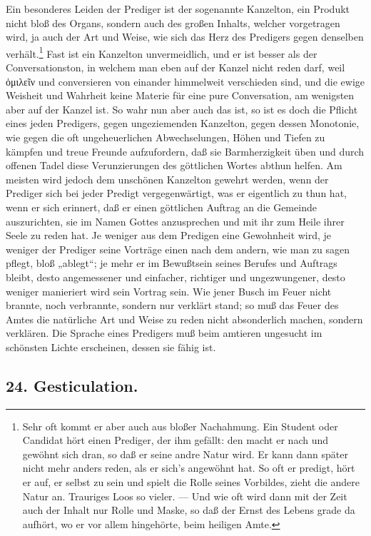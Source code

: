 Ein besonderes Leiden der Prediger ist der sogenannte Kanzelton, ein Produkt nicht bloß des Organs, sondern auch des großen Inhalts, welcher vorgetragen wird, ja auch der Art und Weise, wie sich das Herz des Predigers gegen denselben verhält.\footnote{Sehr oft kommt er aber auch aus bloßer Nachahmung. Ein Student oder Candidat hört einen Prediger, der ihm gefällt: den macht er nach und gewöhnt sich dran, so daß er seine andre Natur wird. Er kann dann später nicht mehr anders reden, als er sich’s angewöhnt hat. So oft er predigt, hört er auf, er selbst zu sein und spielt die Rolle seines Vorbildes, zieht die andere Natur an. Trauriges Loos so vieler. — Und wie oft wird dann mit der Zeit auch der Inhalt nur Rolle und Maske, so daß der Ernst des Lebens grade da aufhört, wo er vor allem hingehörte, beim heiligen Amte.} Fast ist ein Kanzelton unvermeidlich, und
er ist besser als der Conversationston, in welchem man eben auf der Kanzel nicht reden darf, weil ὁμιλεῖν und conversieren von einander himmelweit verschieden sind, und die ewige Weisheit und Wahrheit keine Materie für eine pure Conversation, am wenigsten aber auf der Kanzel ist. So wahr nun aber auch das ist, so ist es doch die Pflicht eines jeden Predigers, gegen ungeziemenden Kanzelton, gegen dessen Monotonie, wie gegen die oft ungeheuerlichen Abwechselungen, Höhen und Tiefen zu kämpfen und treue Freunde aufzufordern, daß sie Barmherzigkeit üben und durch offenen Tadel diese Verunzierungen des göttlichen Wortes abthun helfen. Am meisten wird jedoch dem unschönen Kanzelton gewehrt werden, wenn der Prediger sich bei jeder Predigt vergegenwärtigt, was er eigentlich zu thun hat, wenn er sich erinnert, daß er einen göttlichen Auftrag an die Gemeinde auszurichten, sie im Namen Gottes anzusprechen und mit ihr zum Heile ihrer Seele zu reden hat. Je weniger aus dem Predigen eine Gewohnheit wird, je weniger der Prediger seine Vorträge einen nach dem andern, wie man zu sagen pflegt, bloß „ablegt“; je mehr er im Bewußtsein seines Berufes und Auftrags bleibt, desto angemessener und einfacher, richtiger und ungezwungener, desto weniger manieriert wird sein Vortrag sein. Wie jener Busch im Feuer
nicht brannte, noch verbrannte, sondern nur verklärt stand; so muß das Feuer des Amtes die natürliche Art und Weise zu reden nicht absonderlich machen, sondern verklären. Die Sprache eines Predigers muß beim amtieren ungesucht im schönsten Lichte erscheinen, dessen sie fähig ist.

\subsection*{24. Gesticulation.}

